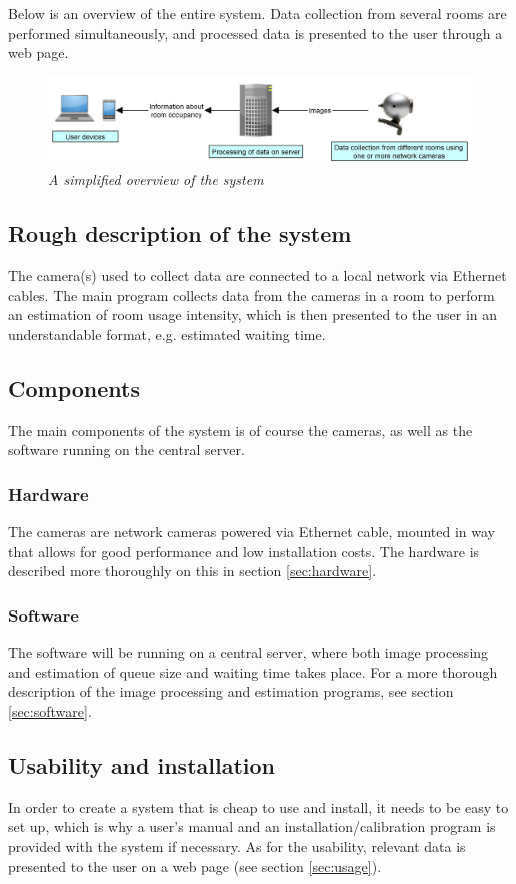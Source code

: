 Below is an overview of the entire system. Data collection from several rooms are performed simultaneously, and processed data is presented to the user through a web page.

\vspace{0.5cm}
\begin{figure}[htb]
	\centering
	\includegraphics[width=170mm]{images/system_overview.png}
	\caption[System overview]{\textit{A simplified overview of the system}}
	\label{fig:block_overview2_fig}  %
\end{figure}

\subsection{Rough description of the system}
The camera(s) used to collect data are connected to a local network via Ethernet cables. The main program collects data from the cameras in a room to perform an estimation of room usage intensity, which is then presented to the user in an understandable format, e.g. estimated waiting time.

\subsection{Components}
The main components of the system is of course the cameras, as well as the software running on the central server.

\subsubsection{Hardware}
The cameras are network cameras powered via Ethernet cable, mounted in way that allows for good performance and low installation costs. The hardware is described more thoroughly on this in section \ref{sec:hardware}.

\subsubsection{Software}
The software will be running on a central server, where both image processing and estimation of queue size and waiting time takes place. For a more thorough description of the image processing and estimation programs, see section \ref{sec:software}.

\subsection{Usability and installation}
In order to create a system that is cheap to use and install, it needs to be easy to set up, which is why a user's manual and an installation/calibration program is provided with the system if necessary. As for the usability, relevant data is presented to the user on a web page (see section \ref{sec:usage}). 

